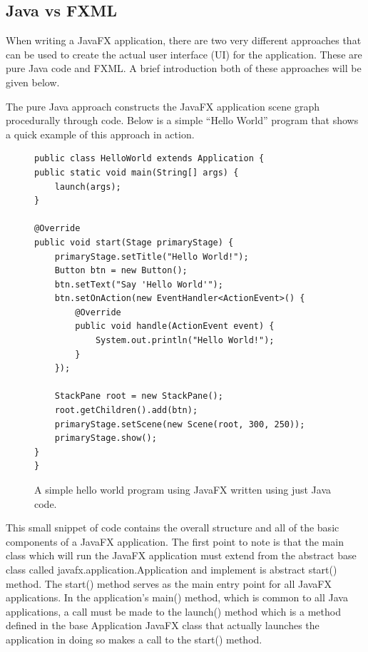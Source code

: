\subsection{Java vs FXML}

When writing a JavaFX application, there are two very different approaches that can be used to create the actual user interface (UI) for the application. These are pure Java code and FXML. A brief introduction both of these approaches will be given below. 

The pure Java approach constructs the JavaFX application scene graph procedurally through code. Below is a simple “Hello World” program that shows a quick example of this approach in action.

\begin{figure}[th]
\centering
\begin{lstlisting}
public class HelloWorld extends Application {
public static void main(String[] args) {
	launch(args);
}

@Override
public void start(Stage primaryStage) {
	primaryStage.setTitle("Hello World!");
	Button btn = new Button();
	btn.setText("Say 'Hello World'");
	btn.setOnAction(new EventHandler<ActionEvent>() {
		@Override
		public void handle(ActionEvent event) {
			System.out.println("Hello World!");
		}
	});
	
	StackPane root = new StackPane();
	root.getChildren().add(btn);
	primaryStage.setScene(new Scene(root, 300, 250));
	primaryStage.show();
}
}
\end{lstlisting}
\caption{A simple hello world program using JavaFX written using just Java code.}
\label{fig:helloWorldJavaFX1}
\end{figure}

This small snippet of code contains the overall structure and all of the basic components of a JavaFX application. The first point to note is that the main class which will run the JavaFX application must extend from the abstract base class called javafx.application.Application and implement is abstract start() method. The start() method serves as the main entry point for all JavaFX applications. In the application’s main() method, which is common to all Java applications, a call must be made to the launch() method which is a method defined in the base Application JavaFX class that actually launches the application in doing so makes a call to the start() method. 

